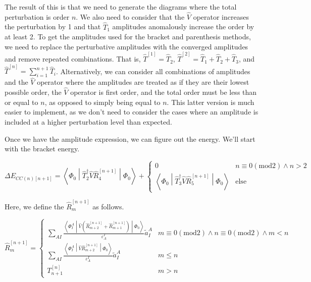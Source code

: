 \documentclass{article}
\begin{document}
The result of this is that we need to generate the diagrams where the total perturbation is order $n$. We also need to consider that the $\hat{V}$ operator increases the perturbation by 1 and that $\hat{T}_1$ amplitudes anomalously increase the order by at least 2. To get the amplitudes used for the bracket and parenthesis methods, we need to replace the perturbative amplitudes with the converged amplitudes and remove repeated combinations. That is, $\hat{T}^{\left[1\right]} = \hat{T}_2$, $\hat{T}^{\left[2\right]} = \hat{T}_1 + \hat{T}_2 + \hat{T}_3$, and $\hat{T}^{\left[n\right]} = \sum_{i = 1}^{n + 1} \hat{T}_i$. Alternatively, we can consider all combinations of amplitudes and the $\hat{V}$ operator where the amplitudes are treated as if they are their lowest possible order, the $\hat{V}$ operator is first order, and the total order must be less than or equal to $n$, as opposed to simply being equal to $n$. This latter version is much easier to implement, as we don't need to consider the cases where an amplitude is included at a higher perturbation level than expected.

Once we have the amplitude expression, we can figure out the energy. We'll start with the bracket energy.

\begin{equation}
  \Delta E_{CC(n)[n + 1]} = \left<\Phi_0\middle|\hat{T}_2^\dagger\hat{V}\hat{R}_4^{\left[n + 1\right]}\middle|\Phi_0\right> + \left\{\begin{matrix}
  0 & n \equiv 0\left(\mathrm{mod}2\right) \wedge n > 2\\
  \left<\Phi_0\middle|\hat{T}_3^\dagger\hat{V}\hat{R}_5^{\left[n + 1\right]}\middle|\Phi_0\right> & \mathrm{else}
  \end{matrix}\right.
\end{equation}

Here, we define the $\hat{R}_m^{\left[n + 1\right]}$ as follows.

\begin{equation}
  \hat{R}_m^{\left[n + 1\right]} = \left\{\begin{matrix}
      \sum_{AI}\frac{\left<\Phi_I^A\middle|\hat{V}\left(\hat{R}_{m + 2}^{\left[n + 1\right]} + \hat{R}_{m + 1}^{\left[n + 1\right]}\right)\middle|\Phi_0\right>}{\varepsilon_A^I}\tilde{a}_I^A & m \equiv 0\left(\mathrm{mod} 2\right) \wedge n \equiv 0\left(\mathrm{mod} 2\right) \wedge m < n\\
      \sum_{AI}\frac{\left<\Phi_{I}^{A}\middle|\hat{V}\hat{R}_{m + 2}^{\left[n + 1\right]}\middle|\Phi_0\right>}{\varepsilon_A^I}\tilde{a}_I^A & m \le n\\
      T_{n + 1}^{\left[n\right]} & m > n
    \end{matrix}\right.
\end{equation}
\end{document}
